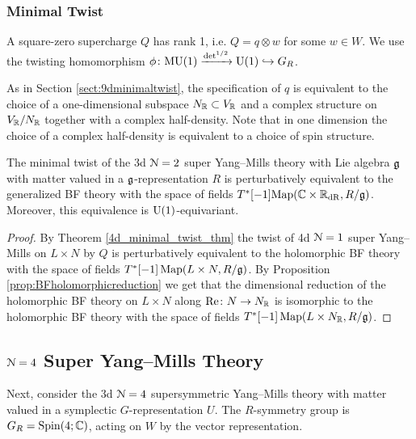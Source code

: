 \documentclass[10pt, oneside]{article}
\begin{document}
\subsubsection{Minimal Twist}
\label{sect:3dminimaltwist}
A square-zero supercharge $Q$ has rank 1, i.e. $Q = q \otimes w$ for some $w \in W$. We use the twisting homomorphism $\phi\colon \mathrm{MU}(1)\xrightarrow{\det^{1/2}} \mathrm{U}(1)\hookrightarrow G_R$.

As in Section \ref{sect:9dminimaltwist}, the specification of $q$ is equivalent to the choice of a one-dimensional subspace $N_\mathbb R\subset V_\mathbb R$ and a complex structure on $V_\mathbb R/N_\mathbb R$ together with a complex half-density.  Note that in one dimension the choice of a complex half-density is equivalent to a choice of spin structure.

\begin{theorem} \label{3d_minimal_twist_thm}
The minimal twist of the 3d $\mathcal N=2$ super Yang--Mills theory with Lie algebra $\mathfrak g$ with matter valued in a $\mathfrak g$-representation $R$ is perturbatively equivalent to the generalized BF theory with the space of fields $T^*[-1]\mathrm{Map}(\mathbb C \times \mathbb R_{\mathrm{dR}}, R/\mathfrak{g})$. Moreover, this equivalence is $\mathrm{U}(1)$-equivariant.
\end{theorem}

\begin{proof}
By Theorem \ref{4d_minimal_twist_thm} the twist of 4d $\mathcal N=1$ super Yang--Mills on $L\times N$ by $Q$ is perturbatively equivalent to the holomorphic BF theory with the space of fields $T^*[-1]\operatorname{Map}(L\times N, R / \mathfrak g)$. By Proposition \ref{prop:BFholomorphicreduction} we get that the dimensional reduction of the holomorphic BF theory on $L\times N$ along $\mathrm{Re}\colon N\rightarrow N_\mathbb R$ is isomorphic to the holomorphic BF theory with the space of fields $T^*[-1]\operatorname{Map}(L\times N_\mathbb R, R/\mathfrak g)$.
\end{proof}

\subsection{\texorpdfstring{$\mathcal N = 4$}{N=4} Super Yang--Mills Theory} \label{3d_4_section}
Next, consider the 3d $\mathcal{N}=4$ supersymmetric Yang--Mills theory with matter valued in a symplectic $G$-representation $U$. The $R$-symmetry group is $G_R = \mathrm{Spin}(4;\mathbb C)$, acting on $W$ by the vector representation.
\end{document}
